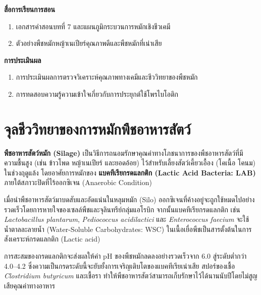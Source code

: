 \noindent\textbf{สื่อการเรียนการสอน}
\begin{enumerate}
    \item เอกสารคำสอนบทที่ 7 และแผนภูมิกระบวนการหมักเชิงชีวเคมี
    \item ตัวอย่างพืชหมักหญ้าเนเปียร์คุณภาพดีและพืชหมักที่เน่าเสีย
\end{enumerate}

\noindent\textbf{การประเมินผล}
\begin{enumerate}
    \item การประเมินผลการตรวจวิเคราะห์คุณภาพทางเคมีและชีววิทยาของพืชหมัก
    \item การทดสอบความรู้ความเข้าใจเกี่ยวกับการประยุกต์ใช้โพรไบโอติก
\end{enumerate}

\newpage


\section{จุลชีววิทยาของการหมักพืชอาหารสัตว์}

\textbf{พืชอาหารสัตว์หมัก (Silage)} เป็นวิธีการถนอมรักษาคุณค่าทางโภชนาการของพืชอาหารสัตว์ที่มีความชื้นสูง (เช่น ข้าวโพด หญ้าเนเปียร์ และยอดอ้อย) ไว้สำหรับเลี้ยงสัตว์เคี้ยวเอื้อง (โคเนื้อ โคนม) ในช่วงฤดูแล้ง โดยอาศัยการหมักของ \textbf{แบคทีเรียกรดแลกติก (Lactic Acid Bacteria: LAB)} ภายใต้สภาวะปิดที่ไร้ออกซิเจน (Anaerobic Condition)

เมื่อนำพืชอาหารสัตว์มาบดสับและอัดแน่นในหลุมหมัก (Silo) ออกซิเจนที่ค้างอยู่จะถูกใช้หมดไปอย่างรวดเร็วโดยการหายใจของเซลล์พืชและจุลินทรีย์กลุ่มแอโรบิก จากนั้นแบคทีเรียกรดแลกติก เช่น \textit{Lactobacillus plantarum}, \textit{Pediococcus acidilactici} และ \textit{Enterococcus faecium} จะใช้น้ำตาลละลายน้ำ (Water-Soluble Carbohydrates: WSC) ในเนื้อเยื่อพืชเป็นสารตั้งต้นในการสังเคราะห์กรดแลกติก (Lactic acid)

การสะสมของกรดแลกติกจะส่งผลให้ค่า pH ของพืชหมักลดลงอย่างรวดเร็วจาก 6.0 สู่ระดับต่ำกว่า 4.0--4.2 ซึ่งความเป็นกรดระดับนี้จะยับยั้งการเจริญเติบโตของแบคทีเรียเน่าเสีย สปอร์ของเชื้อ \textit{Clostridium butyricum} และเชื้อรา ทำให้พืชอาหารสัตว์สามารถเก็บรักษาไว้ได้นานนับปีโดยไม่สูญเสียคุณค่าทางอาหาร

